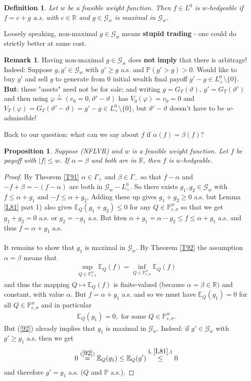 \documentclass[12pt,a4paper, twoside]{article}
\newtheorem{prop}{Proposition}[section]
\newtheorem{defn}{Definition}[section]
\theoremstyle{definition}
\newtheorem{rem}{Remark}[section]
\newcommand{\EE}{\mathbb{E}} %
\newcommand{\PP}{\mathbb{P}} %
\newcommand{\teq}{\overset{\wedge}{=}}
\begin{document}
\begin{defn} Let $w$ be a feasible weight function. Then $f \in L^0$ is $w$-hedgeable if $f=c+g$ a.s. with $c \in \mathbb{R}$ and $g \in \mathcal{G}_w$ is maximal in $\mathcal{G}_w$. 
\end{defn}
Loosely speaking, non-maximal $g \in \mathcal{G}_w$ means \textbf{stupid trading} - one could do strictly better at same cost. 
\begin{rem}Having non-maximal $g \in \mathcal{G}_w$ does \textbf{not imply} that there is arbitrage! Indeed: Suppose $g,g' \in \mathcal{G}_w$ with $g' \geq g$ a.s. and $\PP(g'>g)>0$. Would like to buy $g'$ and sell $g$ to generate from $0$ initial wealth final payoff $g'-g \in L_+^0 \setminus \{0\}$. \textbf{But}: these "assets" need not be for sale; and writing $g= G_T( \vartheta), \ g' = G_T( \vartheta')$ and then using $\varphi \teq (v_0=0, \vartheta'-\vartheta)$ has $V_0( \varphi)=v_0=0$ and $V_T( \varphi)  = G_T( \vartheta'-\vartheta) = g'-g \in L_+^0 \setminus \{0\}$, but $\vartheta'-\vartheta$ doesn't have to be $w$-admissible!
\end{rem}
Back to our question: what can we say about $f$ if $\alpha(f)= \beta(f)$?
\begin{prop} \label{P94} Suppose (NFLVR) and $w$ is a feasible weight function. Let $f$ be payoff with $|f| \leq w$. If $\alpha= \beta$ and both are in $\mathbb{R}$, then $f$ is $w$-hedgeable. 
\end{prop}
\begin{proof}
By Theorem \ref{T91} $\alpha \in \Gamma_+$ and $\beta \in \Gamma_-$ so that $f- \alpha$ and $-f+ \beta = -(f- \alpha)$ are both in $\mathcal{G}_w-L_+^0$. So there exists $g_1,g_2 \in \mathcal{G}_w$ with $f \leq \alpha + g_1$ and $-f \leq \alpha + g_2$. Adding these up gives $g_1 + g_2 \geq 0$ a.s. but Lemma \ref{L81} part 1) also gives $\EE_Q(g_1+g_2) \leq 0$ for any $Q \in \PP_{e, \sigma}^w$ so that we get $g_1 + g_2=0$ a.s. or $g_2=-g_1$ a.s. But hten $\alpha + g_1= \alpha -g_2 \leq f \leq \alpha + g_1$ a.s. and thus $f= \alpha + g_1$ a.s. 
\\\\
It remains to show that $g_1$ is maximal in $\mathcal{G}_w$. By Theorem \ref{T92} the assumption $\alpha = \beta$ means that 
\begin{align*}
\sup_{Q \in \PP_{e, \sigma}^w } \EE_Q(f) = \inf_{Q \in \PP_{e, \sigma}^w } \EE_Q(f)
\end{align*}
and thus the mapping $Q \mapsto \EE_Q(f)$ is finite-valued (because $\alpha= \beta \in \mathbb{R})$ and constant, with value $\alpha$. But $f= \alpha + g_1$ a.s. and so we must have $\EE_Q(g_1)=0$ for all $Q \in \PP_{e, \sigma}^w$ and in particular 
\begin{align*} \label{92}
\EE_Q(g_1)=0, \text{ for some } Q \in \PP_{e, \sigma}^w. \tag{10.2}
\end{align*}
But (\ref{92}) already implies that $g_1$ is maximal in $\mathcal{G}_w$. Indeed: if $g' \in \mathcal{G}_w$ with $g' \geq g_1$ a.s. then we get 
\begin{align*}
0 \overset{(\ref{92})}= \EE_Q(g_1) \leq \EE_Q(g') \overset{\text{L } \ref{L81},1}\leq 0  
\end{align*}
and therefore $g'=g_1$ a.s. ($Q$ and $\PP$ a.s.). 
\end{proof}
\end{document}
